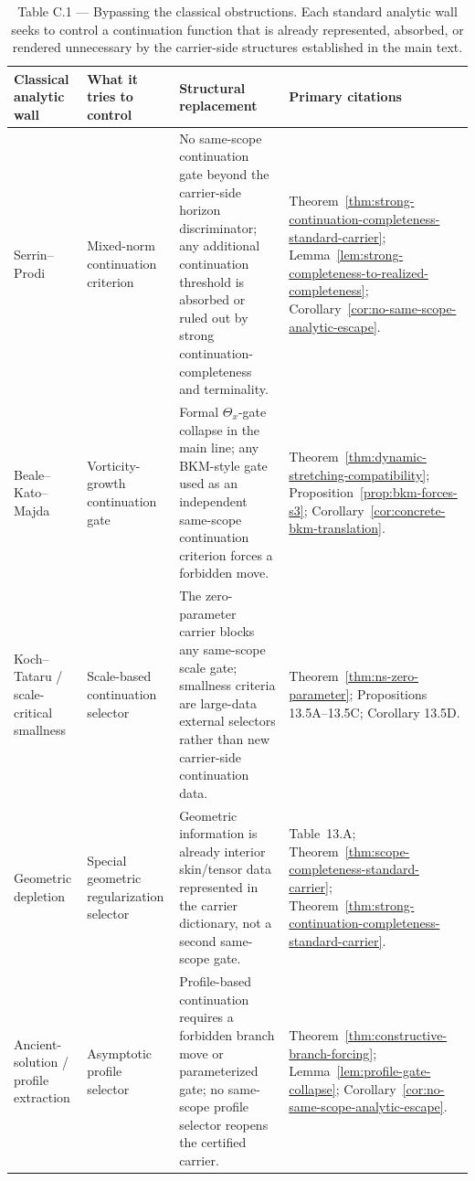 \begin{table}[H]
\centering
\small
\setlength{\tabcolsep}{5pt}
\renewcommand{\arraystretch}{1.2}
\begin{tabularx}{\textwidth}{>{\raggedright\arraybackslash}p{}>{\raggedright\arraybackslash}p{}>{\raggedright\arraybackslash}X>{\raggedright\arraybackslash}p{}}
\toprule
\textbf{Classical analytic wall} & \textbf{What it tries to control} & \textbf{Structural replacement} & \textbf{Primary citations}\\
\midrule
Serrin--Prodi & Mixed-norm continuation criterion & No same-scope continuation gate beyond the carrier-side horizon discriminator; any additional continuation threshold is absorbed or ruled out by strong continuation-completeness and terminality. & Theorem~\ref{thm:strong-continuation-completeness-standard-carrier}; Lemma~\ref{lem:strong-completeness-to-realized-completeness}; Corollary~\ref{cor:no-same-scope-analytic-escape}.\\
\addlinespace[2pt]
Beale--Kato--Majda & Vorticity-growth continuation gate & Formal $\Theta_x$-gate collapse in the main line; any BKM-style gate used as an independent same-scope continuation criterion forces a forbidden move. & Theorem~\ref{thm:dynamic-stretching-compatibility}; Proposition~\ref{prop:bkm-forces-s3}; Corollary~\ref{cor:concrete-bkm-translation}.\\
\addlinespace[2pt]
Koch--Tataru / scale-critical smallness & Scale-based continuation selector & The zero-parameter carrier blocks any same-scope scale gate; smallness criteria are large-data external selectors rather than new carrier-side continuation data. & Theorem~\ref{thm:ns-zero-parameter}; Propositions 13.5A--13.5C; Corollary 13.5D.\\
\addlinespace[2pt]
Geometric depletion & Special geometric regularization selector & Geometric information is already interior skin/tensor data represented in the carrier dictionary, not a second same-scope gate. & Table~13.A; Theorem~\ref{thm:scope-completeness-standard-carrier}; Theorem~\ref{thm:strong-continuation-completeness-standard-carrier}.\\
\addlinespace[2pt]
Ancient-solution / profile extraction & Asymptotic profile selector & Profile-based continuation requires a forbidden branch move or parameterized gate; no same-scope profile selector reopens the certified carrier. & Theorem~\ref{thm:constructive-branch-forcing}; Lemma~\ref{lem:profile-gate-collapse}; Corollary~\ref{cor:no-same-scope-analytic-escape}.\\
\bottomrule
\end{tabularx}
\caption{Table C.1 --- Bypassing the classical obstructions. Each standard analytic wall seeks to control a continuation function that is already represented, absorbed, or rendered unnecessary by the carrier-side structures established in the main text.}
\label{tab:appendix-obstruction-ledger}
\end{table}

